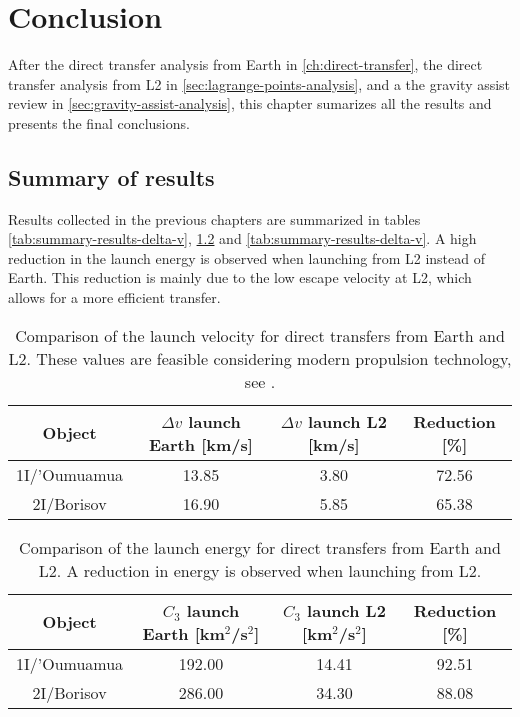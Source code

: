 \chapter{Conclusion}

After the direct transfer analysis from Earth in \ref{ch:direct-transfer}, the
direct transfer analysis from L2 in \ref{sec:lagrange-points-analysis}, and a
the gravity assist review in \ref{sec:gravity-assist-analysis}, this chapter
sumarizes all the results and presents the final conclusions.

\section{Summary of results}

Results collected in the previous chapters are summarized in tables
\ref{tab:summary-results-delta-v}, \ref{tab:summary-results-c3-launch} and
\ref{tab:summary-results-delta-v}. A high reduction in the launch energy is
observed when launching from L2 instead of Earth. This reduction is mainly due
to the low escape velocity at L2, which allows for a more efficient transfer.

\vspace{1cm}
\begin{table}[H]
  \centering
  \begin{tabular}{|c|c|c|c|}
    \hline
    Object       & $\Delta v$ launch Earth [km/s] & $\Delta v$ launch L2 [km/s] & Reduction [\%] \\
    \hline
    1I/'Oumuamua & 13.85                           & 3.80 & 72.56          \\
    \hline
    2I/Borisov   & 16.90                            & 5.85
          & 65.38          \\
    \hline
  \end{tabular}
  \caption[Comparison of the launch velocity for direct transfers from Earth and
    L2.]{Comparison of the launch velocity for direct transfers from Earth and
        L2. These values are feasible considering modern propulsion technology,
        see \cite{longhurst2021}.}
  \label{tab:summary-results-v-launch}
\end{table}

\vspace{1cm}
\begin{table}[H]
  \centering
  \begin{tabular}{|c|c|c|c|}
    \hline
    Object       & $C_3$ launch Earth [km$^2$/s$^2$] & $C_3$ launch L2 [km$^2$/s$^2$] & Reduction [\%] \\
    \hline
    1I/'Oumuamua & 192.00                            & 14.41                          & 92.51          \\
    \hline
    2I/Borisov   & 286.00                            & 34.30                          & 88.08          \\
    \hline
  \end{tabular}
  \caption[Comparison of the launch energy for direct transfers from Earth and
    L2.]{Comparison of the launch energy for direct transfers from Earth and L2. A reduction in energy is observed when launching from L2.}
  \label{tab:summary-results-c3-launch}
\end{table}

